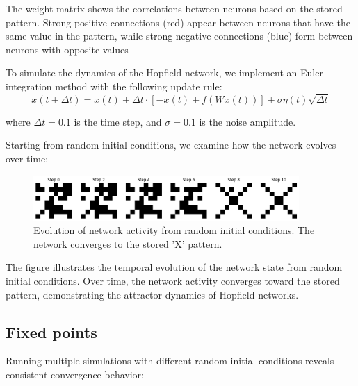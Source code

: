 \documentclass{article}
\begin{document}
The weight matrix shows the correlations between neurons based on the stored pattern. Strong positive connections (red) appear between neurons that have the same value in the pattern, while strong negative connections (blue) form between neurons with opposite values

To simulate the dynamics of the Hopfield network, we implement an Euler integration method with the following update rule:
\begin{equation}
x(t+\Delta t) = x(t) + \Delta t \cdot [-x(t) + f(Wx(t))] + \sigma\eta(t)\sqrt{\Delta t}
\end{equation}

where $\Delta t = 0.1$ is the time step, and $\sigma = 0.1$ is the noise amplitude.

Starting from random initial conditions, we examine how the network evolves over time:

\begin{figure}[H]
\centering
\includegraphics[width=0.9\textwidth]{Network Activity X.png}
\caption{Evolution of network activity from random initial conditions. The network converges to the stored 'X' pattern.}
\label{fig:network_dynamics}
\end{figure}

The figure illustrates the temporal evolution of the network state from random initial conditions. Over time, the network activity converges toward the stored pattern, demonstrating the attractor dynamics of Hopfield networks.




\subsection{Fixed points}


Running multiple simulations with different random initial conditions reveals consistent convergence behavior:
\end{document}

